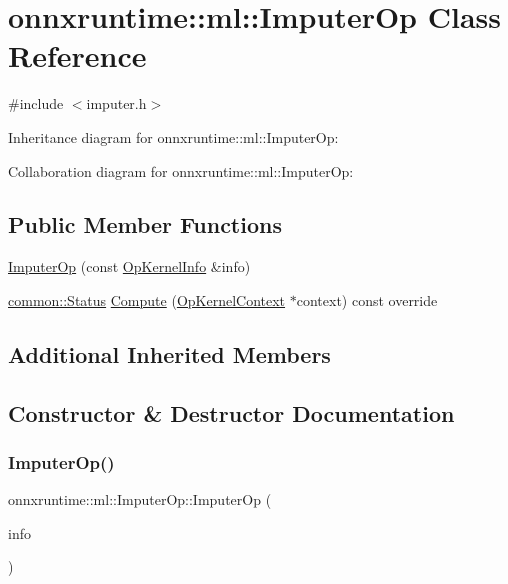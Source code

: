 \hypertarget{classonnxruntime_1_1ml_1_1ImputerOp}{}\section{onnxruntime\+:\+:ml\+:\+:Imputer\+Op Class Reference}
\label{classonnxruntime_1_1ml_1_1ImputerOp}


{\ttfamily \#include $<$imputer.\+h$>$}



Inheritance diagram for onnxruntime\+:\+:ml\+:\+:Imputer\+Op\+:


Collaboration diagram for onnxruntime\+:\+:ml\+:\+:Imputer\+Op\+:
\subsection*{Public Member Functions}
\begin{DoxyCompactItemize}
\item 
\mbox{\hyperlink{classonnxruntime_1_1ml_1_1ImputerOp_a95f569c5bfe0fda99b474fc9da54be22}{Imputer\+Op}} (const \mbox{\hyperlink{classonnxruntime_1_1OpKernelInfo}{Op\+Kernel\+Info}} \&info)
\item 
\mbox{\hyperlink{classonnxruntime_1_1common_1_1Status}{common\+::\+Status}} \mbox{\hyperlink{classonnxruntime_1_1ml_1_1ImputerOp_a0113237b5a386fd9f32513d55005a8fb}{Compute}} (\mbox{\hyperlink{classonnxruntime_1_1OpKernelContext}{Op\+Kernel\+Context}} $\ast$context) const override
\end{DoxyCompactItemize}
\subsection*{Additional Inherited Members}


\subsection{Constructor \& Destructor Documentation}
\mbox{\label{classonnxruntime_1_1ml_1_1ImputerOp_a95f569c5bfe0fda99b474fc9da54be22}} 
\subsubsection{\texorpdfstring{Imputer\+Op()}{ImputerOp()}}
{\footnotesize\ttfamily onnxruntime\+::ml\+::\+Imputer\+Op\+::\+Imputer\+Op (\begin{DoxyParamCaption}\item[{const \mbox{\hyperlink{classonnxruntime_1_1OpKernelInfo}{Op\+Kernel\+Info}} \&}]{info }\end{DoxyParamCaption})\hspace{0.3cm}{\ttfamily [explicit]}}



